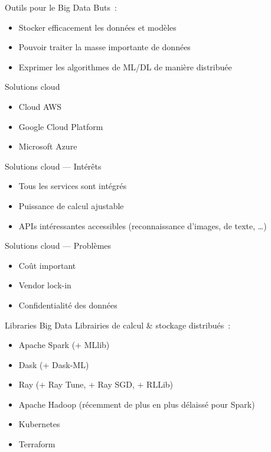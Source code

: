 \begin{frame}{Outils pour le Big Data}
  Buts~:
  \begin{itemize}[<+->]
    \item Stocker efficacement les données et modèles
    \item Pouvoir traiter la masse importante de données
    \item Exprimer les algorithmes de ML/DL de manière distribuée
  \end{itemize}
\end{frame}

\begin{frame}{Solutions cloud}
  \begin{itemize}[<+->]
    \item Cloud AWS
    \item Google Cloud Platform
    \item Microsoft Azure
  \end{itemize}
\end{frame}

\begin{frame}{Solutions cloud --- Intérêts}
  \begin{itemize}[<+->]
    \item Tous les services sont intégrés
    \item Puissance de calcul ajustable
    \item APIs intéressantes accessibles (reconnaissance d'images, de texte, …)
  \end{itemize}
\end{frame}

\begin{frame}{Solutions cloud --- Problèmes}
  \begin{itemize}[<+->]
    \item Coût important
    \item Vendor lock-in
    \item Confidentialité des données
  \end{itemize}
\end{frame}

\begin{frame}{Libraries Big Data}
  Librairies de calcul \& stockage distribués~:
  \begin{itemize}[<+->]
    \item Apache Spark (+ MLlib)
    \item Dask (+ Dask-ML)
    \item Ray (+ Ray Tune, + Ray SGD, + RLLib)
    \item Apache Hadoop (récemment de plus en plus délaissé pour Spark)
  \end{itemize}  

  \begin{itemize}[<+->]
    \item Kubernetes
    \item Terraform
  \end{itemize}
\end{frame}